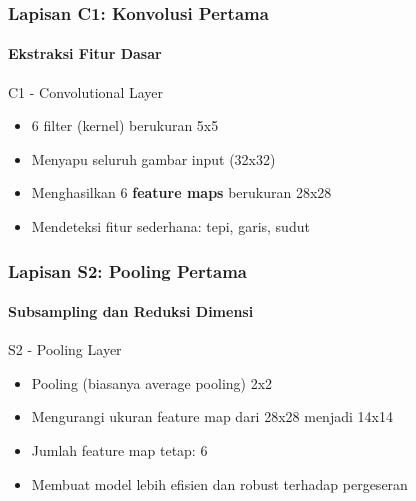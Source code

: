 \documentclass[t,aspectratio=169,xcolor=dvipsnames]{beamer}
\begin{document}
\begin{frame}
    \frametitle{Lapisan C1: Konvolusi Pertama}
    \framesubtitle{Ekstraksi Fitur Dasar}
    \small
    \begin{block}{C1 - Convolutional Layer}
        \begin{itemize}
            \item 6 filter (kernel) berukuran 5x5
            \item Menyapu seluruh gambar input (32x32)
            \item Menghasilkan 6 \textbf{feature maps} berukuran 28x28
            \item Mendeteksi fitur sederhana: tepi, garis, sudut
        \end{itemize}
    \end{block}
\end{frame}

\begin{frame}
    \frametitle{Lapisan S2: Pooling Pertama}
    \framesubtitle{Subsampling dan Reduksi Dimensi}
    \small
    \begin{block}{S2 - Pooling Layer}
        \begin{itemize}
            \item Pooling (biasanya average pooling) 2x2
            \item Mengurangi ukuran feature map dari 28x28 menjadi 14x14
            \item Jumlah feature map tetap: 6
            \item Membuat model lebih efisien dan robust terhadap pergeseran
        \end{itemize}
    \end{block}
\end{frame}
\end{document}
